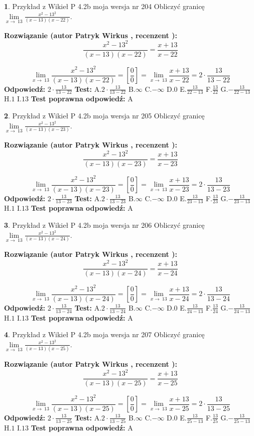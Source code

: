 \documentclass[12pt, a4paper]{article}
\theoremstyle{definition} %
\newtheorem{zad}{}
\newcommand{\zadStart}[1]{\begin{zad}#1\newline}
\newcommand{\zadStop}{\end{zad}}
\newcommand{\rozwStart}[2]{\noindent \textbf{Rozwiązanie (autor #1 , recenzent #2): }\newline}
\newcommand{\rozwStop}{\newline}
\newcommand{\odpStart}{\noindent \textbf{Odpowiedź:}\newline}
\newcommand{\odpStop}{\newline}
\newcommand{\testStart}{\noindent \textbf{Test:}\newline}
\newcommand{\testStop}{\newline}
\newcommand{\kluczStart}{\noindent \textbf{Test poprawna odpowiedź:}\newline}
\newcommand{\kluczStop}{\newline}
\begin{document}
\zadStart{Przykład z Wikieł P 4.2b moja wersja nr 204}
Obliczyć granicę $\lim\limits_{x\to\ 13}\frac{x^{2}-13^{2}}{(x-13)(x-22)}$.
\zadStop
\rozwStart{Patryk Wirkus}{}
$$\frac{x^{2}-13^{2}}{(x-13)(x-22)}=\frac{x+13}{x-22}$$

$$\lim\limits_{x\to\ 13}\frac{x^{2}-13^{2}}{(x-13)(x-22)}=[\frac{0}{0}]=\lim\limits_{x\to\ 13}\frac{x+13}{x-22}=2 \cdot \frac{13}{13-22}$$
\rozwStop
\odpStart
$2 \cdot \frac{13}{13-22}$
\odpStop
\testStart
A.$2 \cdot \frac{13}{13-22}$
B.$\infty$
C.$-\infty$
D.$0$
E.$\frac{13}{22-13}$
F.$\frac{13}{22}$
G.$-\frac{13}{22-13}$
H.$1$
I.$13$
\testStop
\kluczStart
A
\kluczStop



\zadStart{Przykład z Wikieł P 4.2b moja wersja nr 205}
Obliczyć granicę $\lim\limits_{x\to\ 13}\frac{x^{2}-13^{2}}{(x-13)(x-23)}$.
\zadStop
\rozwStart{Patryk Wirkus}{}
$$\frac{x^{2}-13^{2}}{(x-13)(x-23)}=\frac{x+13}{x-23}$$

$$\lim\limits_{x\to\ 13}\frac{x^{2}-13^{2}}{(x-13)(x-23)}=[\frac{0}{0}]=\lim\limits_{x\to\ 13}\frac{x+13}{x-23}=2 \cdot \frac{13}{13-23}$$
\rozwStop
\odpStart
$2 \cdot \frac{13}{13-23}$
\odpStop
\testStart
A.$2 \cdot \frac{13}{13-23}$
B.$\infty$
C.$-\infty$
D.$0$
E.$\frac{13}{23-13}$
F.$\frac{13}{23}$
G.$-\frac{13}{23-13}$
H.$1$
I.$13$
\testStop
\kluczStart
A
\kluczStop



\zadStart{Przykład z Wikieł P 4.2b moja wersja nr 206}
Obliczyć granicę $\lim\limits_{x\to\ 13}\frac{x^{2}-13^{2}}{(x-13)(x-24)}$.
\zadStop
\rozwStart{Patryk Wirkus}{}
$$\frac{x^{2}-13^{2}}{(x-13)(x-24)}=\frac{x+13}{x-24}$$

$$\lim\limits_{x\to\ 13}\frac{x^{2}-13^{2}}{(x-13)(x-24)}=[\frac{0}{0}]=\lim\limits_{x\to\ 13}\frac{x+13}{x-24}=2 \cdot \frac{13}{13-24}$$
\rozwStop
\odpStart
$2 \cdot \frac{13}{13-24}$
\odpStop
\testStart
A.$2 \cdot \frac{13}{13-24}$
B.$\infty$
C.$-\infty$
D.$0$
E.$\frac{13}{24-13}$
F.$\frac{13}{24}$
G.$-\frac{13}{24-13}$
H.$1$
I.$13$
\testStop
\kluczStart
A
\kluczStop



\zadStart{Przykład z Wikieł P 4.2b moja wersja nr 207}
Obliczyć granicę $\lim\limits_{x\to\ 13}\frac{x^{2}-13^{2}}{(x-13)(x-25)}$.
\zadStop
\rozwStart{Patryk Wirkus}{}
$$\frac{x^{2}-13^{2}}{(x-13)(x-25)}=\frac{x+13}{x-25}$$

$$\lim\limits_{x\to\ 13}\frac{x^{2}-13^{2}}{(x-13)(x-25)}=[\frac{0}{0}]=\lim\limits_{x\to\ 13}\frac{x+13}{x-25}=2 \cdot \frac{13}{13-25}$$
\rozwStop
\odpStart
$2 \cdot \frac{13}{13-25}$
\odpStop
\testStart
A.$2 \cdot \frac{13}{13-25}$
B.$\infty$
C.$-\infty$
D.$0$
E.$\frac{13}{25-13}$
F.$\frac{13}{25}$
G.$-\frac{13}{25-13}$
H.$1$
I.$13$
\testStop
\kluczStart
A
\kluczStop
\end{document}
